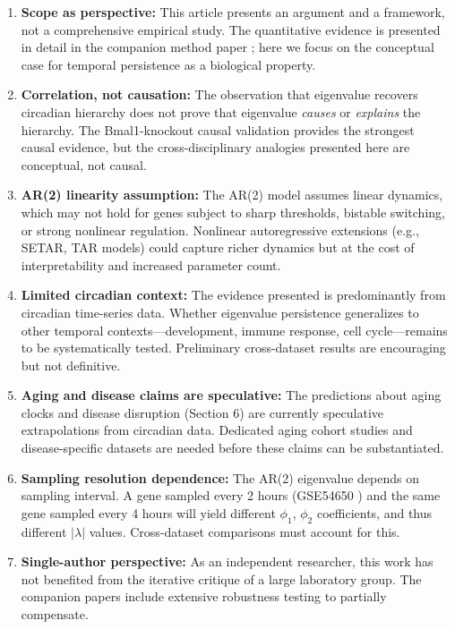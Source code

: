 \documentclass[11pt,letterpaper]{article}
\begin{document}
\begin{enumerate}
\item \textbf{Scope as perspective:} This article presents an argument and a framework, not a comprehensive empirical study. The quantitative evidence is presented in detail in the companion method paper \citep{whiteside2026par2a}; here we focus on the conceptual case for temporal persistence as a biological property.

\item \textbf{Correlation, not causation:} The observation that eigenvalue recovers circadian hierarchy does not prove that eigenvalue \textit{causes} or \textit{explains} the hierarchy. The Bmal1-knockout causal validation \citep{whiteside2026par2a} provides the strongest causal evidence, but the cross-disciplinary analogies presented here are conceptual, not causal.

\item \textbf{AR(2) linearity assumption:} The AR(2) model assumes linear dynamics, which may not hold for genes subject to sharp thresholds, bistable switching, or strong nonlinear regulation. Nonlinear autoregressive extensions (e.g., SETAR, TAR models) could capture richer dynamics but at the cost of interpretability and increased parameter count.

\item \textbf{Limited circadian context:} The evidence presented is predominantly from circadian time-series data. Whether eigenvalue persistence generalizes to other temporal contexts---development, immune response, cell cycle---remains to be systematically tested. Preliminary cross-dataset results are encouraging but not definitive.

\item \textbf{Aging and disease claims are speculative:} The predictions about aging clocks and disease disruption (Section 6) are currently speculative extrapolations from circadian data. Dedicated aging cohort studies and disease-specific datasets are needed before these claims can be substantiated.

\item \textbf{Sampling resolution dependence:} The AR(2) eigenvalue depends on sampling interval. A gene sampled every 2 hours (GSE54650 \citep{zhang2014circadian}) and the same gene sampled every 4 hours will yield different $\phi_1$, $\phi_2$ coefficients, and thus different $|\lambda|$ values. Cross-dataset comparisons must account for this.

\item \textbf{Single-author perspective:} As an independent researcher, this work has not benefited from the iterative critique of a large laboratory group. The companion papers \citep{whiteside2026par2a} include extensive robustness testing to partially compensate.
\end{enumerate}
\end{document}
